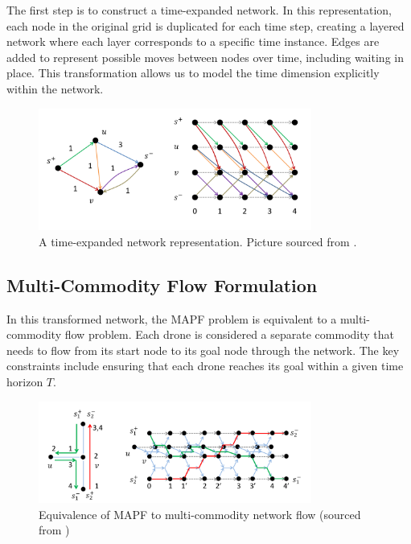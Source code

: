 The first step is to construct a time-expanded network. In this representation, each node in the original grid is duplicated for each time step, creating a layered network where each layer corresponds to a specific time instance. Edges are added to represent possible moves between nodes over time, including waiting in place. This transformation allows us to model the time dimension explicitly within the network.

\begin{figure}[H]
    \centering
    \includegraphics[width=0.8\textwidth]{img/time_extended_net_image.pdf}
    \caption[Time-expanded network representation]{A time-expanded network representation. Picture sourced from .}
    \label{fig:time_expanded_network}
\end{figure}


\subsection{Multi-Commodity Flow Formulation}

In this transformed network, the MAPF problem is equivalent to a multi-commodity flow problem. Each drone is considered a separate commodity that needs to flow from its start node to its goal node through the network. The key constraints include ensuring that each drone reaches its goal within a given time horizon $T$.

\begin{figure}[H]
    \centering
    \includegraphics[width=0.8\textwidth]{img/equi_mapf_flow_image.pdf}
    \caption{Equivalence of MAPF to multi-commodity network flow (sourced from )}
    \label{fig:equi_mapf_flow}
\end{figure}

